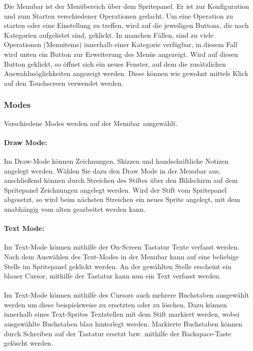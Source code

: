 Die Menubar ist der Menübereich über dem Spritepanel. Er ist zur Konfiguration und zum Starten verschiedener Operationen gedacht. Um eine Operation zu starten oder eine Einstellung zu treffen, wird auf die jeweiligen Buttons, die nach Kategorien aufgelistet sind, geklickt. In manchen Fällen, sind zu viele Operationen (Menuitems) innerhalb einer Kategorie verfügbar, in diesem Fall wird unten ein Button zur Erweiterung des Menüs angezeigt. Wird auf diesen Button geklickt, so öffnet sich ein neues Fenster, auf dem die zusätzlichen Auswahlmöglichkeiten angezeigt werden. Diese können wie gewohnt mittels Klick auf den Touchscreen verwendet werden.

\subsubsection{Modes}

Verschiedene Modes werden auf der Menubar ausgewählt.

\paragraph{Draw Mode:}
Im Draw-Mode können Zeichnungen, Skizzen und handschriftliche Notizen angelegt werden. Wählen Sie dazu den Draw Mode in der Menubar aus, anschließend können durch Streichen des Stiftes über den Bildschirm auf dem Spritepanel Zeichnungen angelegt werden. Wird der Stift vom Spritepanel abgesetzt, so wird beim nächsten Streichen ein neues Sprite angelegt, mit dem unabhängig vom alten gearbeitet werden kann.

\paragraph{Text Mode:}

Im Text-Mode können mithilfe der On-Screen Tastatur Texte verfasst werden. Nach dem Auswählen des Text-Modes in der Menubar kann auf eine beliebige Stelle im Spritepanel geklickt werden. An der gewählten Stelle erscheint ein blauer Cursor, mithilfe der Tastatur kann nun ein Text verfasst werden.\\
\\
Im Text-Mode können mithilfe des Cursors auch mehrere Buchstaben ausgewählt werden um diese beispielsweise zu ersetzten oder zu löschen. Dazu können innerhalb eines Text-Sprites Textstellen mit dem Stift markiert werden, wobei ausgewählte Buchstaben blau hinterlegt werden. Markierte Buchstaben können durch Schreiben auf der Tastatur ersetzt bzw. mithilfe der Backspace-Taste gelöscht werden.

